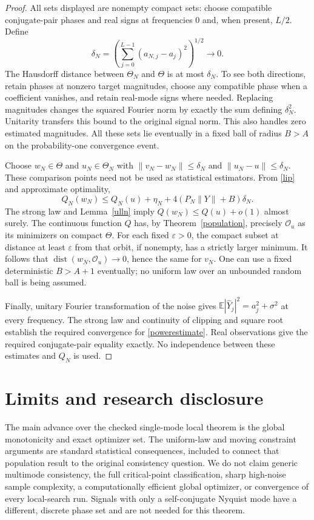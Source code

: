 \documentclass[11pt]{article}
\newcommand{\E}{\mathbb E}
\DeclareMathOperator{\dist}{dist}
\begin{document}
\begin{proof}
All sets displayed are nonempty compact sets: choose compatible
conjugate-pair phases and real signs at frequencies $0$ and, when
present, $L/2$. Define
\[
 \delta_N=\left(\sum_{j=0}^{L-1}(a_{N,j}-a_j)^2\right)^{1/2}
                       \longrightarrow0.
\]
The Hausdorff distance between $\Theta_N$ and $\Theta$ is at most
$\delta_N$. To see both directions, retain phases at nonzero target
magnitudes, choose any compatible phase when a coefficient vanishes,
and retain real-mode signs where needed. Replacing magnitudes changes
the squared Fourier norm by exactly the sum defining $\delta_N^2$.
Unitarity transfers this bound to the original signal norm. This also
handles zero estimated magnitudes. All these sets lie eventually in a
fixed ball of radius $B>A$ on the probability-one convergence event.

Choose $w_N\in\Theta$ and $u_N\in\Theta_N$ with
$\|v_N-w_N\|\leq\delta_N$ and $\|u_N-u\|\leq\delta_N$.
These comparison points need not be used as statistical estimators.
From \eqref{lip} and approximate optimality,
\[
 Q_N(w_N)\leq Q_N(u)+\eta_N
                        +4(P_N\|Y\|+B)\delta_N.
\]
The strong law and Lemma~\ref{ulln} imply
$Q(w_N)\leq Q(u)+o(1)$ almost surely. The continuous function $Q$
has, by Theorem~\ref{population}, precisely $\mathcal O_u$ as its
minimizers on compact $\Theta$. For each fixed $\varepsilon>0$,
the compact subset at distance at least $\varepsilon$ from that orbit,
if nonempty, has a strictly larger minimum. It follows that
$\dist(w_N,\mathcal O_u)\to0$, hence the same for $v_N$.
One can use a fixed deterministic $B>A+1$ eventually; no uniform law
over an unbounded random ball is being assumed.

Finally, unitary Fourier transformation of the noise gives
$\E|\widehat Y_j|^2=a_j^2+\sigma^2$ at every frequency.
The strong law and continuity of clipping and square root establish
the required convergence for \eqref{powerestimate}. Real observations
give the required conjugate-pair equality exactly. No independence
between these estimates and $Q_N$ is used.
\end{proof}

\section{Limits and research disclosure}
The main advance over the checked single-mode local theorem is the
global monotonicity and exact optimizer set. The uniform-law and moving
constraint arguments are standard statistical consequences, included
to connect that population result to the original consistency question.
We do not claim generic multimode consistency, the full critical-point
classification, sharp high-noise sample complexity, a computationally
efficient global optimizer, or convergence of every local-search run.
Signals with only a self-conjugate Nyquist mode have a different,
discrete phase set and are not needed for this theorem.
\end{document}
